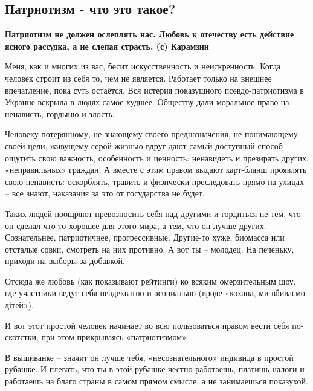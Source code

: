  
 
 

\subsection{Патриотизм - что это такое?}


\textbf{Патриотизм не должен ослеплять нас. Любовь к отечеству есть действие ясного рассудка, а не слепая страсть.
(с) Карамзин}

Меня, как и многих из вас, бесит искусственность и неискренность. Когда человек
строит из себя то, чем не является. Работает только на внешнее впечатление,
пока суть остаётся.  Вся истерия показушного псевдо-патриотизма в Украине
вскрыла в людях самое худшее. Обществу дали моральное право на ненависть,
гордыню и злость.

Человеку потерянному, не знающему своего предназначения, не понимающему своей
цели, живущему серой жизнью вдруг дают самый доступный способ ощутить свою
важность, особенность и ценность: ненавидеть и презирать других, «неправильных»
граждан. А вместе с этим правом выдают карт-бланш проявлять свою ненависть:
оскорблять, травить и физически преследовать прямо на улицах – все знают,
наказания за это от государства не будет. 

Таких людей поощряют превозносить себя над другими и гордиться не тем, что он
сделал что-то хорошее для этого мира, а тем, что он лучше других. Сознательнее,
патриотичнее, прогрессивные. Другие-то хуже, биомасса или отсталые совки,
смотреть на них противно. А вот ты – молодец. На печеньку, приходи на выборы за
добавкой. 

Отсюда же любовь (как показывают рейтинги) ко всяким омерзительным шоу, где
участники ведут себя неадекватно и асоциально (вроде «кохана, ми вбиваємо
дітей»). 

И вот этот простой человек начинает во всю пользоваться правом вести себя
по-скотстки, при этом прикрываясь «патриотизмом».

В вышиванке – значит он лучше тебя, «несознательного» индивида в простой
рубашке. И плевать, что ты в этой рубашке честно работаешь, платишь налоги и
работаешь на благо страны в самом прямом смысле, а не занимаешься показухой. 

